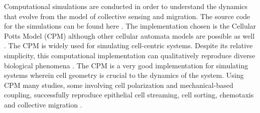 Computational simulations are conducted in order to understand the dynamics that evolve from the model of collective sensing and migration. The source code for the simulations can be found here \cite{ch2code}. The implementation chosen is the Cellular Potts Model (CPM) \cite{graner1992simulation,swat2012multi} although other cellular automata models are possible as well \cite{ermentrout1993cellular,maire2015molecular,mente2015analysis}. The CPM is widely used for simulating cell-centric systems. Despite its relative simplicity, this computational implementation can qualitatively reproduce diverse biological phenomena \cite{maree2007cellular}. The CPM is a very good implementation for simulating systems wherein cell geometry is crucial to the dynamics of the system. Using CPM many studies, some involving cell polarization and mechanical-based coupling, successfully reproduce epithelial cell streaming, cell sorting, chemotaxis and collective migration \cite{maclaren2015models,kabla2012collective,szabo2010collective}.

